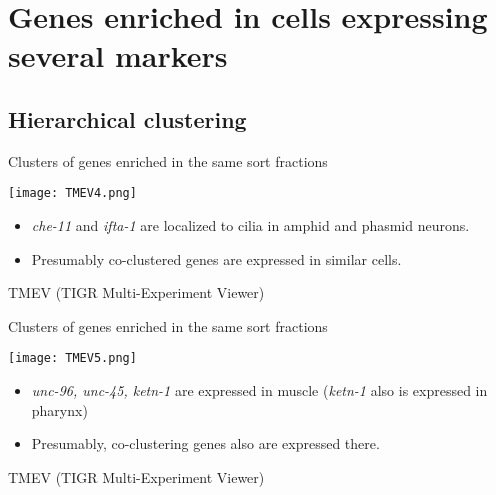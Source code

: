 \documentclass[serif,9pt]{beamer}
\begin{document}
\section{Genes enriched in cells expressing several markers}

\subsection{Hierarchical clustering}

\begin{frame}{Clusters of genes enriched in the same sort fractions}
\begin{minipage}{0.5\textwidth}
\texttt{[image: TMEV4.png]}
\end{minipage}
\begin{minipage}{0.48\textwidth}
{\small 
\begin{itemize}

\item {\em che-11} and {\em ifta-1} are localized to cilia in
amphid and phasmid neurons.

\item Presumably co-clustered genes are expressed
in similar cells.

\end{itemize}
}
\end{minipage}
\vspace{5mm}

\hfill TMEV (TIGR Multi-Experiment Viewer)
\end{frame}

\begin{frame}{Clusters of genes enriched in the same sort fractions}

\begin{minipage}{0.45\textwidth}
\texttt{[image: TMEV5.png]}
\end{minipage}
\begin{minipage}{0.48\textwidth}
\begin{itemize}

\item {\em unc-96, unc-45, ketn-1} are expressed in muscle ({\em ketn-1}
also is expressed in pharynx)

\item Presumably, co-clustering genes also are expressed there.
\end{itemize}

\end{minipage}

\hfill TMEV (TIGR Multi-Experiment Viewer)
\end{frame}
\end{document}
